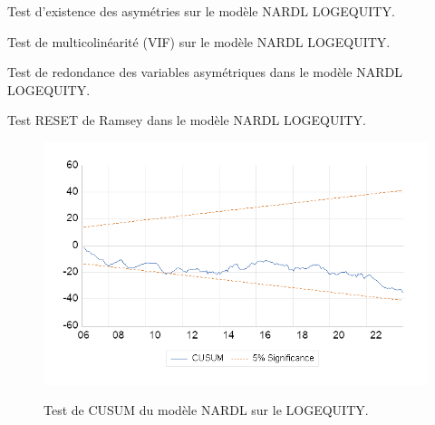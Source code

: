 \begin{table}[H]
    \centering
    \sffamily
    \caption{Test d'existence des asymétries sur le modèle NARDL LOGEQUITY.}
    \label{tab:asymetrie_nardl_logequity}
    \resizebox{0.8\textwidth}{!}{}
\end{table}

\begin{table}[H]
    \centering
    \sffamily
    \caption{Test de multicolinéarité (VIF) sur le modèle NARDL LOGEQUITY.}
    \label{tab:vif_nardl_logequity}
    \resizebox{0.8\textwidth}{!}{}
\end{table}

\begin{table}[H]
    \centering
    \sffamily
    \caption{Test de redondance des variables asymétriques dans le modèle NARDL LOGEQUITY.}
    \label{tab:redondance_nardl_logequity}
    \resizebox{1\textwidth}{!}{}
\end{table}

\begin{table}[H]
    \centering
    \sffamily
    \caption{Test RESET de Ramsey dans le modèle NARDL LOGEQUITY.}
    \label{tab:reset_nardl_logequity}
    \resizebox{1\textwidth}{!}{}
\end{table}

\begin{figure}[H]
    \centering
    \caption{Test de CUSUM du modèle NARDL sur le LOGEQUITY.}
    \includegraphics[scale=0.9]{annexes/cusum_nardl_logequity.png}
    \label{fig:msih_resids}
\end{figure}


